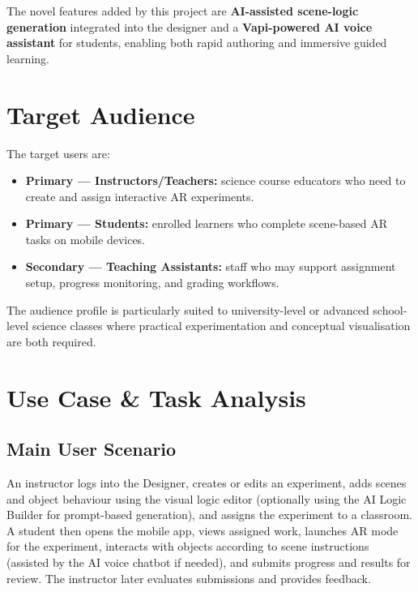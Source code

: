 \documentclass[12pt,a4paper]{article}
\begin{document}
The novel features added by this project are \textbf{AI-assisted scene-logic generation}
integrated into the designer and a \textbf{Vapi-powered AI voice assistant} for students,
enabling both rapid authoring and immersive guided learning.

\section{Target Audience}

The target users are:

\begin{itemize}[leftmargin=1.4cm]
  \item \textbf{Primary --- Instructors/Teachers:} science course educators who need to
        create and assign interactive AR experiments.
  \item \textbf{Primary --- Students:} enrolled learners who complete scene-based AR
        tasks on mobile devices.
  \item \textbf{Secondary --- Teaching Assistants:} staff who may support assignment
        setup, progress monitoring, and grading workflows.
\end{itemize}

The audience profile is particularly suited to university-level or advanced school-level
science classes where practical experimentation and conceptual visualisation are both
required.

\section{Use Case \& Task Analysis}

\subsection{Main User Scenario}

An instructor logs into the Designer, creates or edits an experiment, adds scenes and
object behaviour using the visual logic editor (optionally using the AI Logic Builder
for prompt-based generation), and assigns the experiment to a classroom. A student then
opens the mobile app, views assigned work, launches AR mode for the experiment, interacts
with objects according to scene instructions (assisted by the AI voice chatbot if needed),
and submits progress and results for review. The instructor later evaluates submissions
and provides feedback.
\end{document}
